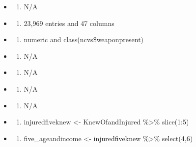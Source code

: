\documentclass[
]{book}
\providecommand{\tightlist}{%
  \setlength{\itemsep}{0pt}\setlength{\parskip}{0pt}}
\begin{document}
\begin{itemize}
\item
  \begin{enumerate}
  \def\labelenumi{\arabic{enumi}.}
  \tightlist
  \item
    N/A
  \end{enumerate}
\item
  \begin{enumerate}
  \def\labelenumi{\arabic{enumi}.}
  \setcounter{enumi}{1}
  \tightlist
  \item
    23,969 entries and 47 columns
  \end{enumerate}
\item
  \begin{enumerate}
  \def\labelenumi{\arabic{enumi}.}
  \setcounter{enumi}{2}
  \tightlist
  \item
    numeric and class(ncvs\$weaponpresent)
  \end{enumerate}
\item
  \begin{enumerate}
  \def\labelenumi{\arabic{enumi}.}
  \setcounter{enumi}{3}
  \tightlist
  \item
    N/A
  \end{enumerate}
\item
  \begin{enumerate}
  \def\labelenumi{\arabic{enumi}.}
  \setcounter{enumi}{4}
  \tightlist
  \item
    N/A
  \end{enumerate}
\item
  \begin{enumerate}
  \def\labelenumi{\arabic{enumi}.}
  \setcounter{enumi}{5}
  \tightlist
  \item
    N/A
  \end{enumerate}
\item
  \begin{enumerate}
  \def\labelenumi{\arabic{enumi}.}
  \setcounter{enumi}{6}
  \tightlist
  \item
    N/A
  \end{enumerate}
\item
  \begin{enumerate}
  \def\labelenumi{\arabic{enumi}.}
  \setcounter{enumi}{7}
  \tightlist
  \item
    injuredfiveknew \textless- KnewOfandInjured \%\textgreater\% slice(1:5)
  \end{enumerate}
\item
  \begin{enumerate}
  \def\labelenumi{\arabic{enumi}.}
  \setcounter{enumi}{8}
  \tightlist
  \item
    five\_ageandincome \textless- injuredfiveknew \%\textgreater\% select(4,6)
  \end{enumerate}
\end{itemize}
\end{document}
